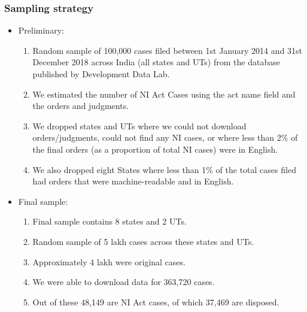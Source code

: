 \documentclass[10pt,aspectratio=169]{beamer}
\begin{document}
\begin{frame}
  \frametitle{Sampling strategy}
  \begin{itemize}
  \item Preliminary:
    \begin{enumerate}
    \item Random sample of 100,000 cases filed between 1st January
      2014 and 31st December 2018 across India (all states and UTs)
      from the database published by Development Data Lab.
    \item We estimated the number of NI Act Cases using the act name
      field and the orders and judgments.
    \item We dropped states and UTs where we could not download
      orders/judgments, could not find any NI cases, or where less
      than 2\% of the final orders (as a proportion of total NI cases)
      were in English.
    \item We also dropped eight States where less than 1\% of the
      total cases filed had orders that were machine-readable and in
      English.
    \end{enumerate}
  \item Final sample:
    \begin{enumerate}
    \item Final sample contains 8 states and 2 UTs.
    \item Random sample of 5 lakh cases across these states and UTs. 
    \item Approximately 4 lakh were original cases.
    \item We were able to download data for 363,720 cases.
    \item Out of these 48,149 are NI Act cases, of which 37,469 are disposed.
  \end{enumerate}
  \end{itemize}
\end{frame}
\end{document}
